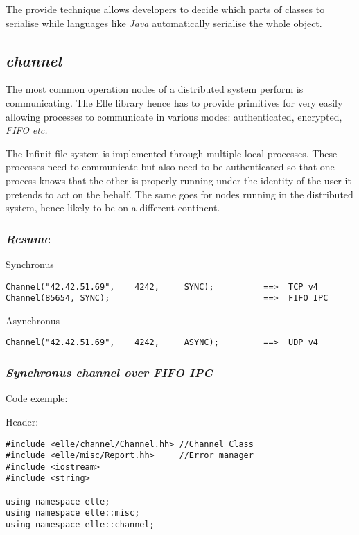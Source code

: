 \documentclass[10pt,a4wide]{article}
\newcommand\etc[0]{\textit{etc.}}
\begin{document}
The provide technique allows developers to decide which parts of classes
to serialise while languages like \textit{Java} automatically serialise
the whole object.

%
%

\subsection{\textit{channel}}

The most common operation nodes of a distributed system perform is
communicating. The Elle library hence has to provide primitives for
very easily allowing processes to communicate in various modes: authenticated,
encrypted, \textit{FIFO} \etc{}

The Infinit file system is implemented through multiple local processes.
These processes need to communicate but also need to be authenticated so
that one process knows that the other is properly running under the
identity of the user it pretends to act on the behalf. The same goes for
nodes running in the distributed system, hence likely to be on a different
continent.

\subsubsection{\textit{Resume}}
Synchronus
\begin{verbatim}		   	   
Channel("42.42.51.69",    4242,     SYNC);          ==>  TCP v4
Channel(85654, SYNC);                               ==>  FIFO IPC
\end{verbatim}
Asynchronus
\begin{verbatim}		   	   
Channel("42.42.51.69",    4242,     ASYNC);         ==>  UDP v4
\end{verbatim}


\subsubsection{\textit{Synchronus channel over FIFO IPC}}

Code exemple:

Header:
\begin{verbatim}
#include <elle/channel/Channel.hh> //Channel Class
#include <elle/misc/Report.hh>     //Error manager
#include <iostream>
#include <string>

using namespace elle;
using namespace elle::misc;
using namespace elle::channel;
\end{verbatim}
\end{document}
